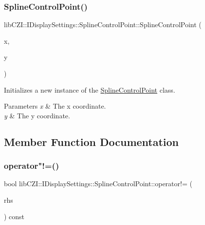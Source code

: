 \subsubsection{\texorpdfstring{Spline\+Control\+Point()}{SplineControlPoint()}}
{\footnotesize\ttfamily lib\+C\+Z\+I\+::\+I\+Display\+Settings\+::\+Spline\+Control\+Point\+::\+Spline\+Control\+Point (\begin{DoxyParamCaption}\item[{double}]{x,  }\item[{double}]{y }\end{DoxyParamCaption})\hspace{0.3cm}{\ttfamily [inline]}}

Initializes a new instance of the \hyperlink{structlib_c_z_i_1_1_i_display_settings_1_1_spline_control_point}{Spline\+Control\+Point} class. 
\begin{DoxyParams}{Parameters}
{\em x} & The x coordinate. \\
\hline
{\em y} & The y coordinate. \\
\hline
\end{DoxyParams}


\subsection{Member Function Documentation}
\mbox{\label{structlib_c_z_i_1_1_i_display_settings_1_1_spline_control_point_a2cb37002034da0bbe0ad9972358d3d5a}} 
\subsubsection{\texorpdfstring{operator"!=()}{operator!=()}}
{\footnotesize\ttfamily bool lib\+C\+Z\+I\+::\+I\+Display\+Settings\+::\+Spline\+Control\+Point\+::operator!= (\begin{DoxyParamCaption}\item[{const \hyperlink{structlib_c_z_i_1_1_i_display_settings_1_1_spline_control_point}{Spline\+Control\+Point} \&}]{rhs }\end{DoxyParamCaption}) const\hspace{0.3cm}{\ttfamily [inline]}}


